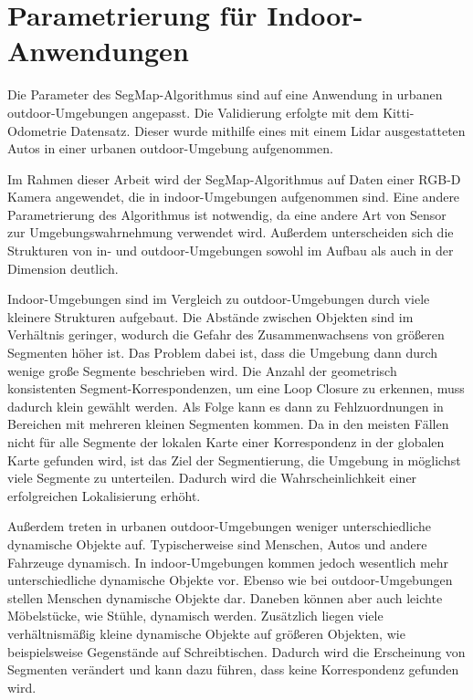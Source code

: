 \chapter[Parametrierung für Indoor-Anwendungen (Schmelzer)]{Parametrierung für Indoor-Anwendungen}

Die Parameter des SegMap-Algorithmus sind auf eine Anwendung in urbanen outdoor-Umgebungen angepasst. Die Validierung erfolgte mit dem Kitti-Odometrie Datensatz. Dieser wurde mithilfe eines mit einem Lidar ausgestatteten Autos in einer urbanen outdoor-Umgebung aufgenommen. 

Im Rahmen dieser Arbeit wird der SegMap-Algorithmus auf Daten einer RGB-D Kamera angewendet, die in indoor-Umgebungen aufgenommen sind. Eine andere Parametrierung des Algorithmus ist notwendig, da eine andere Art von Sensor zur Umgebungswahrnehmung verwendet wird. Außerdem unterscheiden sich die Strukturen von in- und outdoor-Umgebungen sowohl im Aufbau als auch in der Dimension deutlich. 

Indoor-Umgebungen sind im Vergleich zu outdoor-Umgebungen durch viele kleinere Strukturen aufgebaut. Die Abstände zwischen Objekten sind im Verhältnis geringer, wodurch die Gefahr des Zusammenwachsens von größeren Segmenten höher ist. Das Problem dabei ist, dass die Umgebung dann durch wenige große Segmente beschrieben wird. Die Anzahl der geometrisch konsistenten Segment-Korrespondenzen, um eine Loop Closure zu erkennen, muss dadurch klein gewählt werden. Als Folge kann es dann zu Fehlzuordnungen in Bereichen mit mehreren kleinen Segmenten kommen. Da in den meisten Fällen nicht für alle Segmente der lokalen Karte einer Korrespondenz in der globalen Karte gefunden wird, ist das Ziel der Segmentierung, die Umgebung in möglichst viele Segmente zu unterteilen. Dadurch wird die Wahrscheinlichkeit einer erfolgreichen Lokalisierung erhöht. 

Außerdem treten in urbanen outdoor-Umgebungen weniger unterschiedliche dynamische Objekte auf. Typischerweise sind Menschen, Autos und andere Fahrzeuge dynamisch. In indoor-Umgebungen kommen jedoch wesentlich mehr unterschiedliche dynamische Objekte vor. Ebenso wie bei outdoor-Umgebungen stellen Menschen dynamische Objekte dar. Daneben können aber auch leichte Möbelstücke, wie Stühle, dynamisch werden. Zusätzlich liegen viele verhältnismäßig kleine dynamische Objekte auf größeren Objekten, wie beispielsweise Gegenstände auf Schreibtischen. Dadurch wird die Erscheinung von Segmenten verändert und kann dazu führen, dass keine Korrespondenz gefunden wird.  

